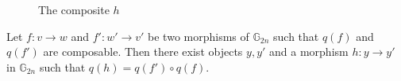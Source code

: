 {\begin{figure}[ht]
\begin{eq*}
 \end{eq*}
\caption{The composite $h$}
\label{composite}
\end{figure}
\clearpage
}

\begin{prop}\label{ama5} Let $f: v \to w$ and $f' : w' \to v'$ be two morphisms of $\mathbb{G}_{2n}$ such that $q(f)$ and $q(f')$ are composable. Then there exist objects $y, y'$ and a morphism $h: y \to y'$ in $\mathbb{G}_{2n}$ such that $q(h) = q(f') \circ q(f)$.
\end{prop}
